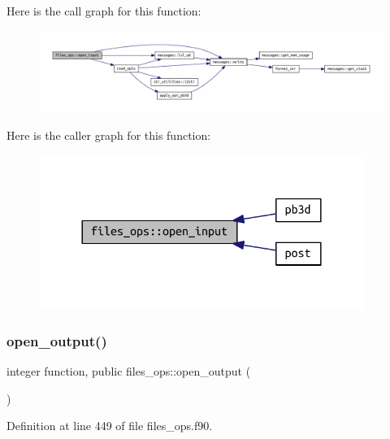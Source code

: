 Here is the call graph for this function\+:
\nopagebreak
\begin{figure}[H]
\begin{center}
\leavevmode
\includegraphics[width=350pt]{namespacefiles__ops_a63a81a5a451f787025429878b2cec81b_cgraph}
\end{center}
\end{figure}
Here is the caller graph for this function\+:
\nopagebreak
\begin{figure}[H]
\begin{center}
\leavevmode
\includegraphics[width=300pt]{namespacefiles__ops_a63a81a5a451f787025429878b2cec81b_icgraph}
\end{center}
\end{figure}
\mbox{\label{namespacefiles__ops_ad681a9e8083a6f664cf0f9d17ebe279c}} 
\subsubsection{\texorpdfstring{open\+\_\+output()}{open\_output()}}
{\footnotesize\ttfamily integer function, public files\+\_\+ops\+::open\+\_\+output (\begin{DoxyParamCaption}{ }\end{DoxyParamCaption})}



Definition at line 449 of file files\+\_\+ops.\+f90.

